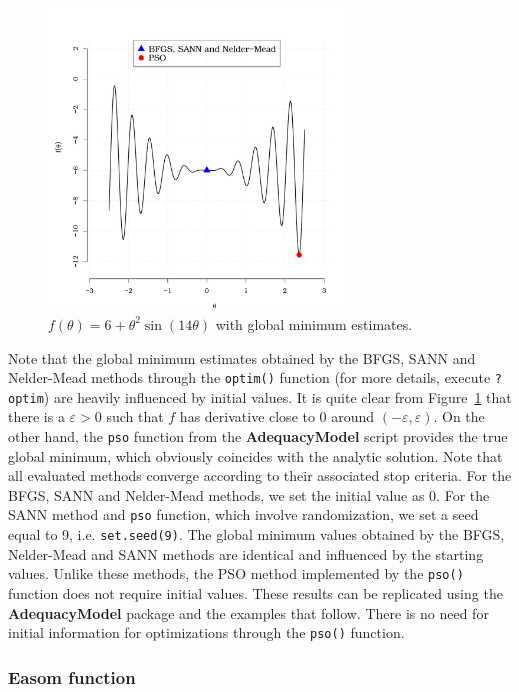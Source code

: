 \documentclass[10pt,letterpaper]{article}
\begin{document}
\begin{figure}[H]
\centering
\includegraphics[width=8cm,height=8cm]{plot_f}
\caption{$f(\theta) = 6 + \theta^2 \sin(14\theta)$ with global minimum estimates.}
\label{fig:f}
\end{figure}

Note that the global minimum estimates obtained by the BFGS, SANN and Nelder-Mead methods through the \texttt{optim()} function (for more details, execute \texttt{?optim}) are heavily influenced by initial values.
It is quite clear from Figure~\ref{fig:f} that there is a $\varepsilon >0$
such that $f$ has derivative close to 0 around $(-\varepsilon, \varepsilon)$.
On the other hand, the \texttt{pso} function from the
\textbf{AdequacyModel} script provides the true global minimum, which obviously coincides with the analytic solution.
Note that all evaluated methods converge according to their associated stop criteria.
For the BFGS, SANN and Nelder-Mead methods, we set the initial value as 0.
For the SANN method and \texttt{pso} function, which involve randomization, we set a seed equal to 9, i.e. \texttt{set.seed(9)}.
The global minimum values obtained by the BFGS, Nelder-Mead and SANN methods are identical and influenced by the starting values.
Unlike these methods, the PSO method implemented by the \texttt{pso()} function does not require initial values.
These results can be replicated using the \textbf{AdequacyModel} package and the examples that follow.
There is no need for initial information for optimizations through the \texttt{pso()} function.



\subsubsection{Easom function}
\end{document}
